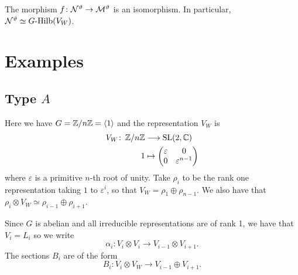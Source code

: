 \documentclass{amsart}
\theoremstyle{definition}
\newcommand\VW{V_W}
\begin{document}
\begin{corollary}
The morphism $f \colon \mathcal{N}^\vartheta \rightarrow \mathcal{M}^\vartheta$ is an isomorphism.
In particular, $\cN^\vartheta \simeq G\textup{-Hilb}(\VW)$.
\end{corollary}

\section{Examples}



\subsection{Type $A$}
Here we have $G=\mathbb{Z}/n\mathbb{Z}=\langle 1\rangle$ and the representation $\VW$ is
\begin{align*}
    \VW \colon \, \bZ/n\bZ &\longrightarrow \SL(2,\bC) \\
    1 &\mapsto \begin{pmatrix} \varepsilon & 0 \\ 0 & \varepsilon^{n-1} \end{pmatrix}
\end{align*}
where $\varepsilon$ is a primitive $n$-th root of unity.
Take $\rho_i$ to be the rank one representation taking $1$ to $\varepsilon^i$, so that $\VW=\rho_1 \oplus \rho_{n-1}$.
We also have that $\rho_i \otimes \VW \simeq \rho_{i-1} \oplus \rho_{i+1}$.

Since $G$ is abelian and all irreducible representations are of rank 1, we have that $V_i = L_i$ so we write $$\alpha_i \colon V_i \otimes V_i \longrightarrow V_{i-1} \otimes V_{i+1}.$$
The sections $B_i$ are of the form $$B_i \colon V_i \otimes \VW \longrightarrow V_{i-1} \oplus V_{i+1}.$$
\end{document}
